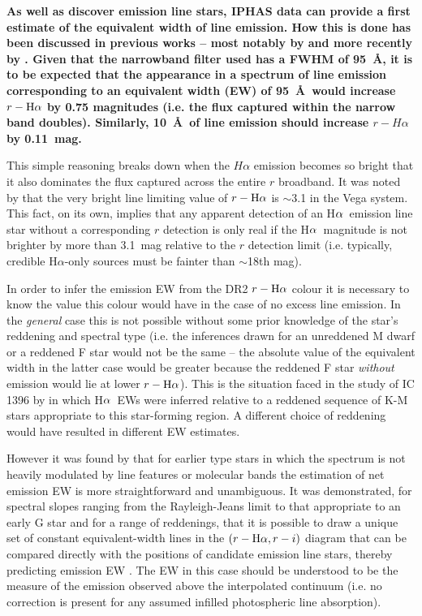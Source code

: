 \documentclass[a4paper,useAMS,usenatbib]{mn2e}
\def\ha{\mbox{H$\rm \alpha$}}
\begin{document}
{ \bf
As well as discover emission line stars, IPHAS data can provide a
first estimate of the equivalent width of line emission.
How this is done has been discussed in previous works 
-- most notably by \citet{Drew2005}
and more recently by \cite{Barentsen2011a}.
Given that the narrowband filter used has a FWHM of 95~\AA ,
it is to be expected that the appearance
in a spectrum of line emission corresponding to an equivalent width (EW)
of 95~\AA\ would increase $r - \ha$ by 0.75 magnitudes
(i.e. the flux captured within the narrow band doubles).
Similarly, 10~\AA\ of line emission
should increase $r - H\alpha$ by 0.11~mag.

This simple reasoning breaks down
when the $H\alpha$ emission becomes so bright
that it also dominates the flux captured across the entire $r$ broadband.
It was noted by \cite{Drew2005}
that the very bright line limiting value 
of $r - \ha$ is $\sim$3.1 in the Vega system.
This fact, on its own, implies that any apparent detection
of an \ha\ emission line star without a corresponding $r$ 
detection is only real if the \ha\ magnitude is not brighter 
by more than 3.1~mag relative to the $r$ detection limit
(i.e. typically, credible H$\alpha$-only sources
must be fainter than $\sim$18th mag).  

In order to infer the emission EW from the DR2 $r - \ha$ colour
it is necessary to know the value this colour would have
in the case of no excess line emission.
In the {\em general} case this is not possible
without some prior knowledge of the star's reddening and spectral type
(i.e. the inferences drawn for an unreddened M dwarf or
a reddened F star would not be the same -- the absolute value of the 
equivalent width in the latter case would be greater because the 
reddened F star {\em without} emission would lie at lower $r -\ha$).
This is the situation faced in the study of IC 1396 by
\cite{Barentsen2011a} in which \ha\ EWs were inferred
relative to a reddened sequence of K-M stars
appropriate to this star-forming region.
A different choice of reddening would have resulted
in different EW estimates.

However it was found by \cite{Drew2005}
that for earlier type stars in which the spectrum
is not heavily modulated by line features or molecular bands
the estimation of net emission EW is more straightforward and unambiguous.  
It was demonstrated, for spectral slopes ranging
from the Rayleigh-Jeans limit to that appropriate to an early G star
and for a range of reddenings,
that it is possible to draw a unique set of constant equivalent-width 
lines in the $(r - \ha, r - i)$ diagram
that can be compared directly with the positions
of candidate emission line stars,
thereby predicting emission EW \citep[see fig.~6, ][]{Drew2005}.
The EW in this case should be understood
to be the measure of the emission observed
above the interpolated continuum
(i.e. no correction is present
for any assumed infilled photospheric line absorption).

}
\end{document}
